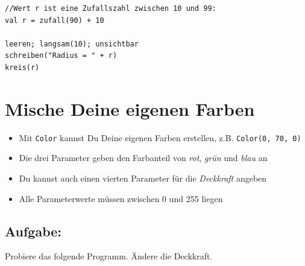   

\begin{lstlisting}[basicstyle={\ttfamily\fontsize{20}{24}\selectfont},numbers=none]
//Wert r ist eine Zufallszahl zwischen 10 und 99:
val r = zufall(90) + 10   

leeren; langsam(10); unsichtbar
schreiben("Radius = " + r)
kreis(r)
\end{lstlisting}
        
\chapter{Mische Deine eigenen Farben}

\begin{itemize}

\item {Mit \lstinline{Color} kannst Du Deine eigenen Farben erstellen, z.B. \lstinline{Color(0, 70, 0)}}
\item {Die drei Parameter geben den Farbanteil von {\it rot}, {\it grün} und {\it blau} an}
\item {Du kannst auch einen vierten Parameter für die {\it Deckkraft} angeben}
\item {Alle Parameterwerte müssen zwischen 0 und 255 liegen}

\end{itemize}


\section*{\color{BrickRed}Aufgabe:}
Probiere das folgende Programm. Ändere die Deckkraft.

